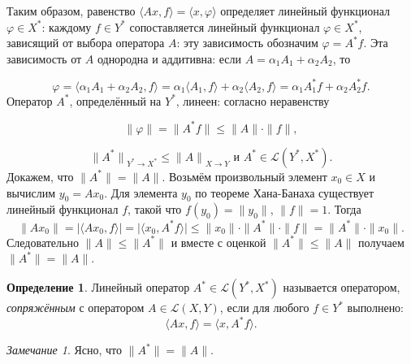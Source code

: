\documentclass[12pt,a4paper,titlepage,oneside]{book}
\theoremstyle{definition}
\newtheorem*{definition}{Определение}
\theoremstyle{plain}
\theoremstyle{break}
\theoremstyle{remark}
\newtheorem*{remark}{Замечание}
\theoremstyle{remark}
\theoremstyle{remark}
\theoremstyle{remark}
\theoremstyle{plain}
\theoremstyle{plain}
\begin{document}
Таким образом, равенство $ \langle Ax,f \rangle  =  \langle x,\varphi \rangle $ определяет линейный функционал $\varphi \in X^*$: каждому $f\in Y^*$ сопоставляется линейный функционал $\varphi\in X^*$, зависящий от выбора оператора $A$: эту зависимость обозначим $\varphi=A^* f$.
Эта зависимость от $A$ однородна и аддитивна:
если $A=\alpha_1A_1+\alpha_2A_2$, то 

$$\varphi = \langle \alpha_1A_1 + \alpha_2A_2, f \rangle  = \alpha_1 \langle A_1,f \rangle + \alpha_2 \langle A_2,f \rangle  = \alpha_1A_1^*f + \alpha_2A_2^* f.$$
Оператор $A^*$, определённый на $Y^*$, линеен: согласно неравенству

$$\lVert \varphi \lVert = \lVert A^* f \lVert \leqslant \lVert A \lVert \cdot \lVert f \lVert,$$

$${\lVert A^* \lVert}_{Y^* \to X^*} \leqslant 
{\lVert A \lVert}_{X \to Y} \mbox{ и } A^* \in \mathcal{L}(Y^*,X^*).$$
Докажем, что $\lVert A^* \lVert = 
\lVert A \lVert$. Возьмём произвольный элемент $x_0 \in X$ и вычислим $y_0=Ax_0$. Для элемента $y_0$ по теореме Хана-Банаха существует линейный функционал $f$, такой что $f(y_0)= \lVert y_0 \lVert$, $\lVert f \lVert =1$. Тогда
$$\lVert Ax_0 \lVert = \vert  \langle Ax_0,f \rangle  \vert =
\vert  \langle x_0,A^*f \rangle  \vert \leqslant 
\lVert x_0 \lVert \cdot \lVert A^* \lVert
\cdot \lVert f \lVert = \lVert A^* \lVert
\cdot \lVert x_0 \lVert.$$
Следовательно $\lVert A \lVert \leqslant
\lVert A^* \lVert$ и вместе с оценкой $\lVert A^* \lVert \leqslant 
\lVert A \lVert$ получаем $\lVert A^* \lVert = 
\lVert A \lVert$.
\begin{definition}
Линейный оператор $A^* \in \mathcal{L}(Y^*,X^*)$ называется оператором, \textit{сопряжённым} с оператором $A \in \mathcal{L}(X,Y)$, если для любого $f \in Y^*$ выполнено:
$$\langle Ax,f \rangle  =  \langle x,A^*f \rangle.$$
\end{definition}
\begin{remark}
Ясно, что $\lVert A^* \lVert = \lVert A \lVert$.
\end{remark}
\end{document}
